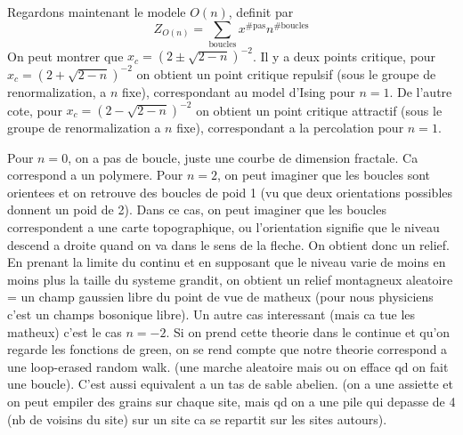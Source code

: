 \documentclass[a4paper]{book}
\theoremstyle{definition}
\theoremstyle{remark}
\begin{document}
Regardons maintenant le modele $O(n)$, definit par 
\begin{equation}
    Z_{O(n)} = \sum_{\text{boucles}} x^{\#\text{pas}} n^{\#\text{boucles}}
\end{equation}
On peut montrer que $x_c = (2 \pm \sqrt{2-n})^{-2}$. Il y a deux points critique, pour $x_c = (2 + \sqrt{2-n})^{-2}$ on obtient un point critique repulsif (sous le groupe de renormalization, a $n$ fixe), correspondant au model d'Ising pour $n=1$. De l'autre cote, pour $x_c = (2 - \sqrt{2-n})^{-2}$ on obtient un point critique attractif (sous le groupe de renormalization a $n$ fixe), correspondant a la percolation pour $n=1$. \par \medskip 
Pour $n=0$, on a pas de boucle, juste une courbe de dimension fractale. Ca correspond a un polymere. Pour $n=2$, on peut imaginer que les boucles sont orientees et on retrouve des boucles de poid 1 (vu que deux orientations possibles donnent un poid de 2). Dans ce cas, on peut imaginer que les boucles correspondent a une carte topographique, ou l'orientation signifie que le niveau descend a droite quand on va dans le sens de la fleche. On obtient donc un relief. En prenant la limite du continu et en supposant que le niveau varie de moins en moins plus la taille du systeme grandit, on obtient un relief montagneux aleatoire = un champ gaussien libre du point de vue de matheux (pour nous physiciens c'est un champs bosonique libre). Un autre cas interessant (mais ca tue les matheux) c'est le cas $n=-2$. Si on prend cette theorie dans le continue et qu'on regarde les fonctions de green, on se rend compte que notre theorie correspond a une loop-erased random walk. (une marche aleatoire mais ou on efface qd on fait une boucle). C'est aussi equivalent a un tas de sable abelien. (on a une assiette et on peut empiler des grains sur chaque site, mais qd on a une pile qui depasse de 4 (nb de voisins du site) sur un site ca se repartit sur les sites autours). \par \medskip 
\end{document}
